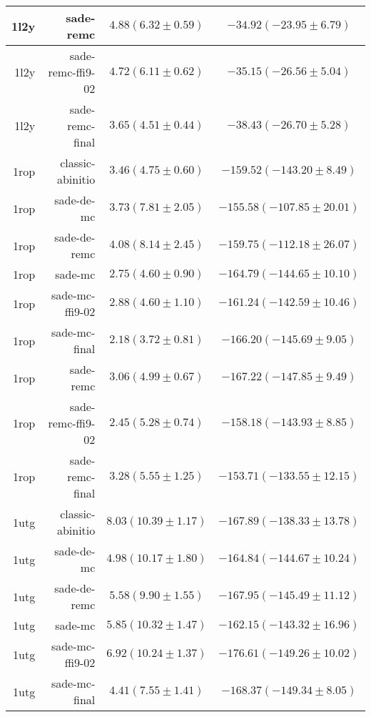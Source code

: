 \begin{table}
\begin{tabular}{r|r|c|c}
        1l2y &          sade-remc & $4.88 (  6.32 \pm   0.59)$ & $-34.92 (-23.95 \pm   6.79)$ \\ \hline
        1l2y &  sade-remc-ffi9-02 & $4.72 (  6.11 \pm   0.62)$ & $-35.15 (-26.56 \pm   5.04)$ \\ \hline
        1l2y &    sade-remc-final & $3.65 (  4.51 \pm   0.44)$ & $-38.43 (-26.70 \pm   5.28)$ \\ \hline
        \hline
        1rop &   classic-abinitio & $3.46 (  4.75 \pm   0.60)$ & $-159.52 (-143.20 \pm   8.49)$ \\ \hline
        1rop &         sade-de-mc & $3.73 (  7.81 \pm   2.05)$ & $-155.58 (-107.85 \pm  20.01)$ \\ \hline
        1rop &       sade-de-remc & $4.08 (  8.14 \pm   2.45)$ & $-159.75 (-112.18 \pm  26.07)$ \\ \hline
        1rop &            sade-mc & $2.75 (  4.60 \pm   0.90)$ & $-164.79 (-144.65 \pm  10.10)$ \\ \hline
        1rop &    sade-mc-ffi9-02 & $2.88 (  4.60 \pm   1.10)$ & $-161.24 (-142.59 \pm  10.46)$ \\ \hline
        1rop &      sade-mc-final & $2.18 (  3.72 \pm   0.81)$ & $-166.20 (-145.69 \pm   9.05)$ \\ \hline
        1rop &          sade-remc & $3.06 (  4.99 \pm   0.67)$ & $-167.22 (-147.85 \pm   9.49)$ \\ \hline
        1rop &  sade-remc-ffi9-02 & $2.45 (  5.28 \pm   0.74)$ & $-158.18 (-143.93 \pm   8.85)$ \\ \hline
        1rop &    sade-remc-final & $3.28 (  5.55 \pm   1.25)$ & $-153.71 (-133.55 \pm  12.15)$ \\ \hline
        \hline
        1utg &   classic-abinitio & $8.03 ( 10.39 \pm   1.17)$ & $-167.89 (-138.33 \pm  13.78)$ \\ \hline
        1utg &         sade-de-mc & $4.98 ( 10.17 \pm   1.80)$ & $-164.84 (-144.67 \pm  10.24)$ \\ \hline
        1utg &       sade-de-remc & $5.58 (  9.90 \pm   1.55)$ & $-167.95 (-145.49 \pm  11.12)$ \\ \hline
        1utg &            sade-mc & $5.85 ( 10.32 \pm   1.47)$ & $-162.15 (-143.32 \pm  16.96)$ \\ \hline
        1utg &    sade-mc-ffi9-02 & $6.92 ( 10.24 \pm   1.37)$ & $-176.61 (-149.26 \pm  10.02)$ \\ \hline
        1utg &      sade-mc-final & $4.41 (  7.55 \pm   1.41)$ & $-168.37 (-149.34 \pm   8.05)$ \\ \hline

\end{tabular}
\end{table}
